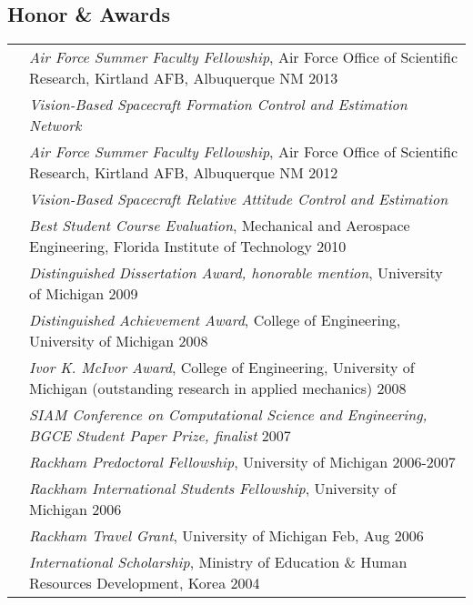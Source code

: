 \documentclass[10pt]{article}
\begin{document}
\vspace*{1cm}

\subsection*{Honor \& Awards}
\setlength{\tabcolsep}{0cm}
\begin{tabularx}{\textwidth}{>{\setlength{\hsize}{0.5cm}}X X}%
& \textit{Air Force Summer Faculty Fellowship}, Air Force Office of Scientific Research, Kirtland AFB, Albuquerque NM \hfill 2013\\
& \quad \textit{Vision-Based Spacecraft Formation Control and Estimation Network}\vspace*{0.08cm}\\
%
& \textit{Air Force Summer Faculty Fellowship}, Air Force Office of Scientific Research, Kirtland AFB, Albuquerque NM \hfill 2012\\
& \quad \textit{Vision-Based Spacecraft Relative Attitude Control and Estimation}\vspace*{0.08cm}\\
%
& \textit{Best Student Course Evaluation}, Mechanical and Aerospace Engineering, Florida Institute of Technology
 \hfill 2010 \\
& \textit{Distinguished Dissertation Award, honorable mention}, University of Michigan
 \hfill 2009 \\
& \textit{Distinguished Achievement Award}, College of Engineering, University of Michigan
 \hfill 2008\\
& \textit{Ivor K. McIvor Award}, College of Engineering, University of Michigan
(outstanding research in applied mechanics) \hfill 2008\\
& \textit{SIAM Conference on Computational Science and Engineering, BGCE Student Paper Prize, finalist} \hfill 2007\\
& \textit{Rackham Predoctoral Fellowship}, University of Michigan \hfill 2006-2007\\
& \textit{Rackham International Students Fellowship}, University of Michigan \hfill 2006\\
& \textit{Rackham Travel Grant}, University of Michigan \hfill Feb, Aug 2006\\
& \textit{International Scholarship}, Ministry of Education \& Human
Resources Development, Korea \hfill 2004
\end{tabularx}


\renewcommand{\thefootnote}{}
\renewcommand\footnotemark{}
\end{document}
